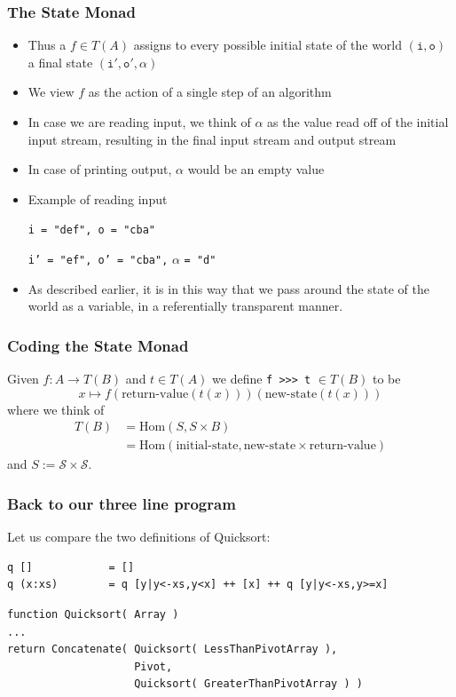 \documentclass[xcolor=pdftex,dvipsnames,table]{beamer}
\renewcommand{\SS}{\ensuremath{\mathcal{S}}}
\newcommand{\Hom}{\ensuremath{\mathrm{Hom}}}
\begin{document}
\begin{frame}[fragile]
    \frametitle{The State Monad}
    \begin{itemize}
        \item Thus a $f\in T(A)$ assigns to every possible initial
            state of the world $\mathtt{(i,o)}$ a final state
            $(\mathtt{i',o'},\alpha)$\pause
        \item We view $f$ as the action of a single step of an
            algorithm\pause
        \item In case we are reading input, we think of $\alpha$ as
            the value read off of the initial input stream, resulting
            in the final input stream and output stream \pause
        \item In case of printing output, $\alpha$ would be an empty
            value\pause
        \item Example of reading input

            \texttt{i = "def", o = "cba"}

            \texttt{i' = "ef", o' = "cba",} $\alpha$ \texttt{= "d"} \pause
        \item As described earlier, it is in this way that we pass
            around the state of the world as a variable, in a
            referentially transparent manner.
    \end{itemize}
\end{frame}

\begin{frame}[fragile]
    \frametitle{Coding the State Monad}
    Given $f : A\rightarrow T(B)$ and $t\in T(A)$ we define
    \verb|f >>> t| $\in T(B)$ to be\pause \[
    x \mapsto f( \text{return-value}(t(x)) )( \text{new-state}(t(x)) )
    \] \pause where we think of
    \begin{align*}
    T(B) & = \Hom( S, S\times B)\\
    & = \Hom(\text{initial-state}, \text{new-state}\times \text{return-value})
    \end{align*} and $S := \SS\times \SS.$
\end{frame}

\begin{frame}[fragile]
    \frametitle{Back to our three line program}
    Let us compare the two definitions of Quicksort:
    {\scriptsize
\begin{lstlisting}
q []            = []
q (x:xs)        = q [y|y<-xs,y<x] ++ [x] ++ q [y|y<-xs,y>=x]
\end{lstlisting}

\begin{verbatim}
function Quicksort( Array )
...
return Concatenate( Quicksort( LessThanPivotArray ),
                    Pivot,
                    Quicksort( GreaterThanPivotArray ) )
\end{verbatim}
}
\end{frame}
\end{document}
